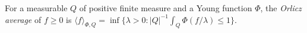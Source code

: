 
For a measurable $Q$ of positive finite measure and a Young function $\Phi$, the \emph{Orlicz average} of $f\ge0$ is $\langle f\rangle_{\Phi,Q}=\inf\{\lambda>0:|Q|^{-1}\int_Q\Phi(f/\lambda)\le1\}$.
